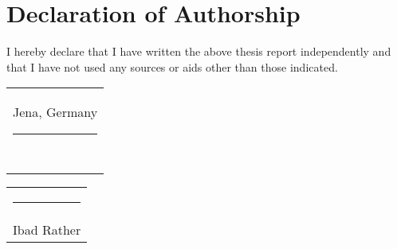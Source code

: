 \documentclass[
thesis  %
]{csthes}
\begin{document}

\chapter*{Declaration of Authorship}

I hereby declare that I have written the above {\thesistype} thesis report independently and that I have not used any sources or aids other than those indicated. 

\bigskip

\begin{tabular}{@{}l@{}}
  Jena, Germany \rule[-0.8em]{7em}{0.5pt}\\[2ex]
  ~
\end{tabular}
\hspace{\fill}%
\begin{tabular}{@{}c@{}}
  \rule[-0.8em]{19em}{0.5pt}\\[2ex]
  {Ibad Rather}
\end{tabular}\hspace{\fill}

\end{document}
